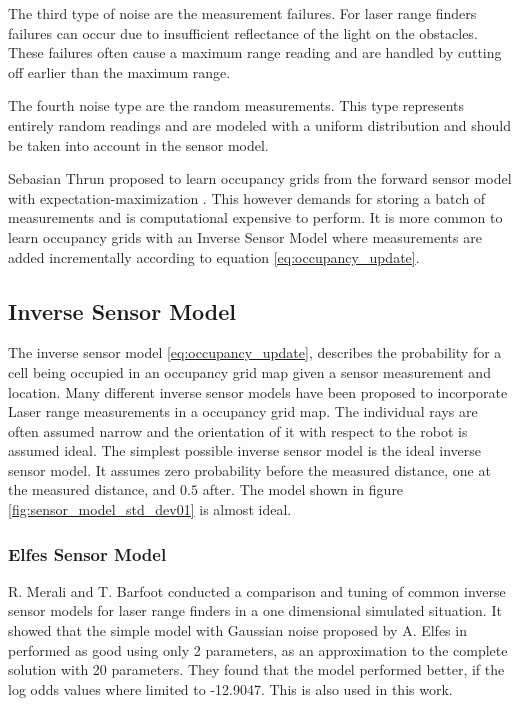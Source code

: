 The third type of noise are the measurement failures. 
For laser range finders failures can occur due to insufficient reflectance of the light on the obstacles. 
These failures often cause a maximum range reading and are handled by cutting off earlier than the maximum range.

The fourth noise type are the random measurements. This type represents entirely random readings and are modeled with a uniform distribution and should be taken into account in the sensor model.

Sebasian Thrun proposed to learn occupancy grids from the forward sensor model with expectation-maximization \cite{probRob}.
This however demands for storing a batch of measurements and is computational expensive to perform. 
It is more common to learn occupancy grids with an Inverse Sensor Model where measurements are added incrementally according to equation \vref{eq:occupancy_update}. 

\subsection{Inverse Sensor Model}
The inverse sensor model \vref{eq:occupancy_update}, describes the probability for a cell being occupied in an occupancy grid map given a sensor measurement and location.
Many different inverse sensor models have been proposed to incorporate Laser range measurements in a occupancy grid map. The individual rays are often assumed narrow and the orientation of it with respect to the robot is assumed ideal.
The simplest possible inverse sensor model is the 
ideal inverse sensor model. It assumes zero probability before the measured distance, one at the measured distance, and $0.5$ after. The model shown in figure \vref{fig:sensor_model_std_dev01} is almost ideal.

\subsubsection{Elfes Sensor Model}
R. Merali and T. Barfoot \cite{sensorModelTuning} conducted a comparison and tuning of common inverse sensor models for laser range finders in a one dimensional simulated situation. It showed that the simple model with Gaussian noise proposed by A. Elfes in \cite{elfes} performed as good using only 2 parameters, as an approximation to the complete solution with 20 parameters. They found that the model performed better, if the log odds values where limited to -12.9047. This is also used in this work.

